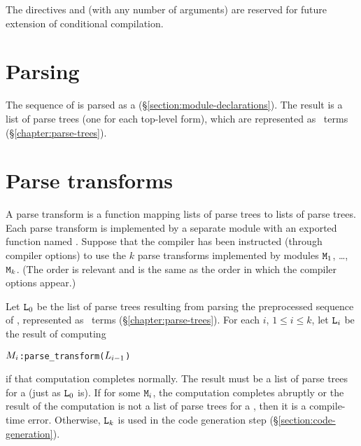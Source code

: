 The directives 
and 
(with any number of arguments) are
reserved for future extension of conditional compilation.

\section{Parsing}

\label{section:parsing}

The sequence of  is parsed as a
 (\S\ref{section:module-declarations}).
The result is a list of parse trees
(one for each top-level form), which are
represented as \Erlang\ terms (\S\ref{chapter:parse-trees}).

\section{Parse transforms}

\label{section:parse-transform}

A parse transform is a function mapping lists of parse trees to lists of
parse trees.  Each parse transform is implemented by a separate module
with an exported function named
.
Suppose that the compiler has been instructed (through compiler options)
to use the $k$
parse transforms implemented by modules ${\tt{\sl M}}_1$, \ldots, ${\tt{\sl M}}_k$.
(The order is relevant and is the same as the order in which the compiler
options appear.)

Let ${\tt{\sl L}}_0$ be the list of parse trees resulting from parsing the
preprocessed sequence
of , represented as \Erlang\ terms (\S\ref{chapter:parse-trees}).
For each $i$, $1\leq i\leq k$, let ${\tt{\sl L}}_i$ be the result of computing
\begin{alltt}
\(\Z{M}\sb{i}\):parse_transform(\(\Z{L}\sb{i-1}\))
\end{alltt}
if that computation completes normally.  The result must be a list of parse
trees for a  (just as ${\tt{\sl L}}_0$ is).
If for some ${\tt{\sl M}}_i$, the computation completes abruptly or the result of the
computation is not a list of parse trees for a , then
it is a compile-time error.
Otherwise, ${\tt{\sl L}}_k$ is used in the code
generation step (\S\ref{section:code-generation}).


